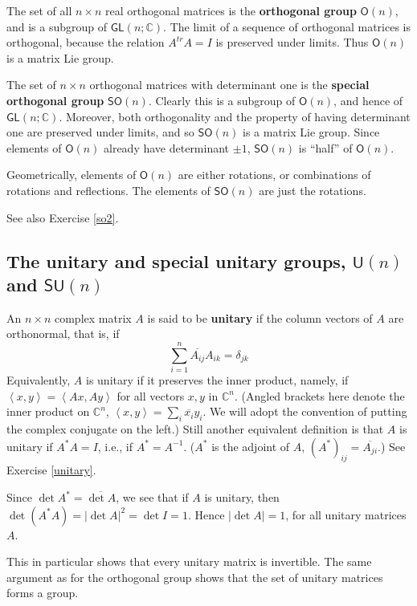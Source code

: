\documentclass[12pt]{amsbook}
\theoremstyle{plain}
\numberwithin{equation}{chapter}
\numberwithin{theorem}{chapter}
\begin{document}
The set of all $n\times n$ real orthogonal matrices is the \textbf{orthogonal
group} $\mathsf{O}(n)$, and is a subgroup of $\mathsf{GL}(n;\mathbb{C})$. The
limit of a sequence of orthogonal matrices is orthogonal, because the relation
$A^{tr}A=I$ is preserved under limits. Thus $\mathsf{O}(n)$ is a matrix Lie group.

The set of $n\times n$ orthogonal matrices with determinant one is the
\textbf{special orthogonal group} $\mathsf{SO}(n)$. Clearly this is a subgroup
of $\mathsf{O}(n)$, and hence of $\mathsf{GL}(n;\mathbb{C})$. Moreover, both
orthogonality and the property of having determinant one are preserved under
limits, and so $\mathsf{SO}(n)$ is a matrix Lie group. Since elements of
$\mathsf{O}(n)$ already have determinant $\pm1$, $\mathsf{SO}(n) $ is ``half''
of $\mathsf{O}(n)$.

Geometrically, elements of $\mathsf{O}(n)$ are either rotations, or
combinations of rotations and reflections. The elements of $\mathsf{SO}(n)$
are just the rotations.

See also Exercise \ref{so2}.

\subsection{The unitary and special unitary groups, $\mathsf{U}(n)$ and
$\mathsf{SU}(n)$}

An $n\times n$ complex matrix $A$ is said to be \textbf{unitary} if the column
vectors of $A$ are orthonormal, that is, if
\[
\sum_{i=1}^{n}\overline{A_{ij}}A_{ik}=\delta_{jk}%
\]
Equivalently, $A$ is unitary if it preserves the inner product, namely, if
$\left\langle x,y\right\rangle =\left\langle Ax,Ay\right\rangle $ for all
vectors $x,y$ in $\mathbb{C}^{n}$. (Angled brackets here denote the inner
product on $\mathbb{C}^{n}$, $\left\langle x,y\right\rangle =\sum_{i}%
\overline{x_{i}}y_{i}$. We will adopt the convention of putting the complex
conjugate on the left.) Still another equivalent definition is that $A$ is
unitary if $A^{*}A=I$, i.e., if $A^{*}=A^{-1}$. ($A^{*}$ is the adjoint of
$A$, $\left(  A^{*}\right)  _{ij}=\overline{A_{ji}}$.) See Exercise
\ref{unitary}.

Since $\det A^{*}=\overline{\det A}$, we see that if $A$ is unitary, then
$\det\left(  A^{*}A\right)  =\left|  \det A\right|  ^{2}=\det I=1$. Hence
$\left|  \det A\right|  =1$, for all unitary matrices $A$.

This in particular shows that every unitary matrix is invertible. The same
argument as for the orthogonal group shows that the set of unitary matrices
forms a group.
\end{document}
